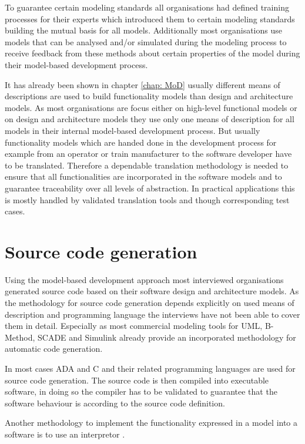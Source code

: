 \documentclass{./template/openetcs2}
\begin{document}
To guarantee certain modeling standards all organisations had defined training processes for their experts which introduced them to certain modeling standards building the mutual basis for all models.  Additionally most organisations use models that can be analysed and/or simulated during the modeling process to receive feedback from these methods about certain properties of the model during their model-based development process.

It has already been shown in chapter \ref{chap: MoD} usually different means of descriptions are used to build functionality models than design and architecture models. As most organisations are focus either on high-level functional models or on design and architecture models they use only one means of description for all models in their internal model-based development process. But usually functionality models which are handed done in the development process for example from an operator or train manufacturer to the software developer have to be translated. Therefore a dependable translation methodology is needed to ensure that all functionalities are incorporated in the software models and to guarantee traceability over all levels of abstraction. In practical applications this is mostly handled by validated translation tools and though corresponding test cases.

\section{Source code generation}

Using the model-based development approach most interviewed organisations generated source code based on their software design and architecture models. As the  methodology for source code generation depends explicitly on used means of description and programming language the interviews have not been able to cover them in detail. Especially as most commercial modeling tools for UML, B-Method, SCADE and Simulink already provide an incorporated methodology for automatic code generation. 

In most cases ADA and C and their related programming languages are used for source code generation. The source code is then compiled into executable software, in doing so the compiler has to be validated to guarantee that the software behaviour is according to the source code definition.

Another methodology to implement the functionality expressed in a model into a software is to use an interpretor .
\end{document}
